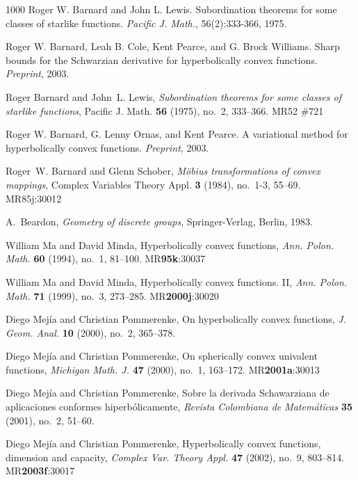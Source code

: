 \documentclass{cmft}
\begin{document}
\begin{thebibliography}{1000}
 Roger W. Barnard and John L. Lewis.  Subordination theorems for some
classes of starlike functions.  \emph{Pacific J. Math.}, 56(2):333-366, 1975.

 Roger W. Barnard, Leah B. Cole, Kent Pearce, and G. Brock
Williams.  Sharp bounds for the Schwarzian derivative for hyperbolically convex
functions. \emph{Preprint}, 2003.

 Roger Barnard and John~L. Lewis, \emph{Subordination theorems for
some classes of starlike functions}, Pacific J. Math. \textbf{56} (1975), no.~2,
333--366.  MR{52 \#721}

 Roger W. Barnard, G. Lenny Ornas, and Kent Pearce. A variational
method for hyperbolically convex functions. \emph{Preprint}, 2003.

 Roger~W. Barnard and Glenn Schober, \emph{M\"obius transformations
of convex mappings}, Complex Variables Theory Appl. \textbf{3} (1984), no.~1-3,
55--69.  MR{85j:30012}

 A.~Beardon, \emph{Geometry of discrete groups}, Springer-Verlag,
Berlin, 1983.

 William Ma and David Minda, Hyperbolically convex functions,
\emph{Ann. Polon.  Math.} \textbf{60} (1994), no.~1,
81--100. MR\textbf{95k}:30037

 William Ma and David Minda, Hyperbolically convex functions. {II},
\emph{Ann. Polon. Math.}  \textbf{71} (1999), no.~3,
273--285. MR\textbf{2000j}:30020

 Diego Mej\'ia and Christian Pommerenke, On hyperbolically convex
functions, \emph{J. Geom. Anal.} \textbf{10} (2000), no.~2, 365--378.

 Diego Mej\'ia and Christian Pommerenke, On spherically convex
univalent functions, \emph{Michigan Math. J.}  \textbf{47} (2000), no.~1,
163--172. MR\textbf{2001a}:30013

 Diego Mej\'ia and Christian Pommerenke, Sobre la derivada
{Schawarziana} de aplicaciones conformes hiperb\'olicamente, \emph{Revista
Colombiana de Matem\'aticas} \textbf{35} (2001), no.~2, 51--60.

 Diego Mej\'ia and Christian Pommerenke, Hyperbolically convex
functions, dimension and capacity, \emph{Complex Var. Theory Appl.} \textbf{47}
(2002), no.~9, 803--814.  MR\textbf{2003f}:30017


\end{thebibliography}
\end{document}

